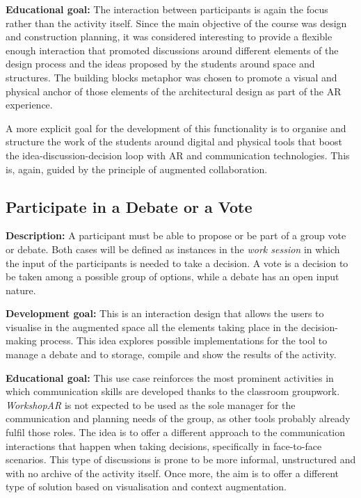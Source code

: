 \noindent
\textbf{Educational goal:} The interaction between participants is again the focus rather than the activity itself. Since the main objective of the course was design and
construction planning, it was considered interesting to provide a flexible enough interaction that promoted discussions around different elements of the design process and
the ideas proposed by the students around space and structures. The building blocks metaphor was chosen to promote a visual and physical anchor of those elements of the
architectural design as part of the \ac{AR} experience.

A more explicit goal for the development of this functionality is to organise and structure the work of the students around digital and physical tools that boost the
idea-discussion-decision loop with \ac{AR} and communication technologies. This is, again, guided by the principle of augmented collaboration.

\subsection{Participate in a Debate or a Vote \label{sec:4-2-8}}

\textbf{Description:} A participant must be able to propose or be part of a group vote or debate. Both cases will be defined as instances in the \emph{work session} in
which the input of the participants is needed to take a decision. A vote is a decision to be taken among a possible group of options, while a debate has an open input
nature.

\noindent
\textbf{Development goal:} This is an interaction design that allows the users to visualise in the augmented space all the elements taking place in the decision-making
process. This idea explores possible implementations for the tool to manage a debate and to storage, compile and show the results of the activity.

\noindent
\textbf{Educational goal:} This use case reinforces the most prominent activities in which communication skills are developed thanks to the classroom groupwork. \emph{WorkshopAR}
is not expected to be used as the sole manager for the communication and planning needs of the group, as other tools probably already fulfil those roles. The idea is to
offer a different approach to the communication interactions that happen when taking decisions, specifically in face-to-face scenarios. This type of discussions is prone
to be more informal, unstructured and with no archive of the activity itself. Once more, the aim is to offer a different type of solution based on visualisation and
context augmentation.

